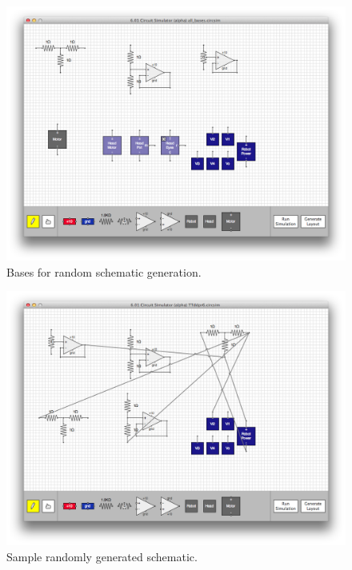 \begin{figure}
\begin{center}
\includegraphics[width=\textwidth]{Images/auto_generation_bases.png}
\caption{Bases for random schematic generation.}
\label{fig:random_gen_bases}
\end{center}
\end{figure}

\begin{figure}
\begin{center}
\includegraphics[width=\textwidth]{Images/auto_generation_example.png}
\caption{Sample randomly generated schematic.}
\label{fig:example_random_schematic}
\end{center}
\end{figure}
